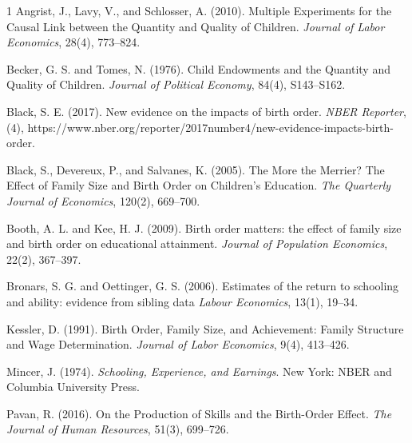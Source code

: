 \documentclass[12pt]{article}
\begin{document}
\newpage
\begin{thebibliography}{1}
Angrist, J., Lavy, V., and Schlosser, A. (2010).
Multiple Experiments for the Causal Link between the Quantity and Quality of Children.
\textit{Journal of Labor Economics}, 28(4), 773--824.

Becker, G. S. and Tomes, N. (1976).
Child Endowments and the Quantity and Quality of Children.
\textit{Journal of Political Economy}, 84(4), S143--S162.

Black, S. E. (2017).
New evidence on the impacts of birth order.
\textit{NBER Reporter}, (4), https://www.nber.org/reporter/2017number4/new-evidence-impacts-birth-order.

Black, S., Devereux, P., and Salvanes, K. (2005).
The More the Merrier? The Effect of Family Size and Birth Order on Children's Education.
\textit{The Quarterly Journal of Economics}, 120(2), 669--700.

Booth, A. L. and Kee, H. J. (2009).
Birth order matters: the effect of family size and birth order on educational attainment.
\textit{Journal of Population Economics}, 22(2), 367--397.

Bronars, S. G. and Oettinger, G. S. (2006).
Estimates of the return to schooling and ability: evidence from sibling data
\textit{Labour Economics}, 13(1), 19--34.

Kessler, D. (1991).
Birth Order, Family Size, and Achievement: Family Structure and Wage Determination.
\textit{Journal of Labor Economics}, 9(4), 413--426.

Mincer, J. (1974).
\textit{Schooling, Experience, and Earnings}.
New York: NBER and Columbia University Press.

Pavan, R. (2016).
On the Production of Skills and the Birth-Order Effect.
\textit{The Journal of Human Resources}, 51(3), 699--726.


\end{thebibliography}
\end{document}
